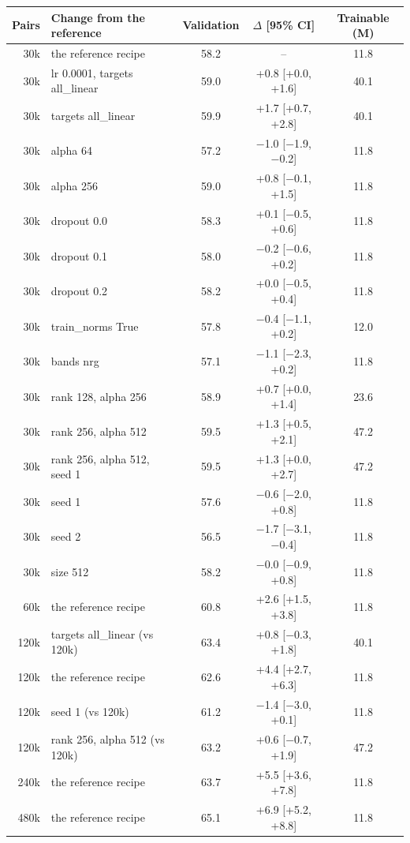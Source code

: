 \begin{tabular}{rlccc}
\toprule
Pairs & Change from the reference & Validation & $\Delta$ [95\% CI] & Trainable (M) \\
\midrule
30k & the reference recipe & 58.2 & -- & 11.8 \\
30k & lr 0.0001, targets all\_linear & 59.0 & +0.8 [+0.0, +1.6] & 40.1 \\
30k & targets all\_linear & 59.9 & +1.7 [+0.7, +2.8] & 40.1 \\
30k & alpha 64 & 57.2 & $-$1.0 [$-$1.9, $-$0.2] & 11.8 \\
30k & alpha 256 & 59.0 & +0.8 [$-$0.1, +1.5] & 11.8 \\
30k & dropout 0.0 & 58.3 & +0.1 [$-$0.5, +0.6] & 11.8 \\
30k & dropout 0.1 & 58.0 & $-$0.2 [$-$0.6, +0.2] & 11.8 \\
30k & dropout 0.2 & 58.2 & +0.0 [$-$0.5, +0.4] & 11.8 \\
30k & train\_norms True & 57.8 & $-$0.4 [$-$1.1, +0.2] & 12.0 \\
30k & bands nrg & 57.1 & $-$1.1 [$-$2.3, +0.2] & 11.8 \\
30k & rank 128, alpha 256 & 58.9 & +0.7 [+0.0, +1.4] & 23.6 \\
30k & rank 256, alpha 512 & 59.5 & +1.3 [+0.5, +2.1] & 47.2 \\
30k & rank 256, alpha 512, seed 1 & 59.5 & +1.3 [+0.0, +2.7] & 47.2 \\
30k & seed 1 & 57.6 & $-$0.6 [$-$2.0, +0.8] & 11.8 \\
30k & seed 2 & 56.5 & $-$1.7 [$-$3.1, $-$0.4] & 11.8 \\
30k & size 512 & 58.2 & $-$0.0 [$-$0.9, +0.8] & 11.8 \\
60k & the reference recipe & 60.8 & +2.6 [+1.5, +3.8] & 11.8 \\
120k & targets all\_linear (vs 120k) & 63.4 & +0.8 [$-$0.3, +1.8] & 40.1 \\
120k & the reference recipe & 62.6 & +4.4 [+2.7, +6.3] & 11.8 \\
120k & seed 1 (vs 120k) & 61.2 & $-$1.4 [$-$3.0, +0.1] & 11.8 \\
120k & rank 256, alpha 512 (vs 120k) & 63.2 & +0.6 [$-$0.7, +1.9] & 47.2 \\
240k & the reference recipe & 63.7 & +5.5 [+3.6, +7.8] & 11.8 \\
480k & the reference recipe & 65.1 & +6.9 [+5.2, +8.8] & 11.8 \\
\bottomrule
\end{tabular}

